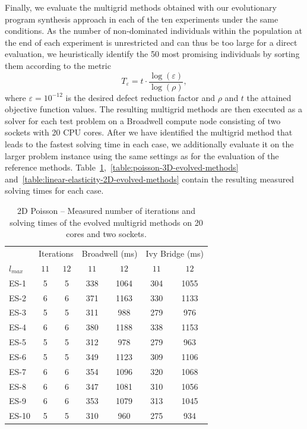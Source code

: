 Finally, we evaluate the multigrid methods obtained with our evolutionary program synthesis approach in each of the ten experiments under the same conditions.
As the number of non-dominated individuals within the population at the end of each experiment is unrestricted and can thus be too large for a direct evaluation, we heuristically identify the 50 most promising individuals by sorting them according to the metric
\begin{equation*}
	T_{\varepsilon} = t \cdot \frac{\log(\varepsilon)}{\log(\rho)},
\end{equation*}
where $\varepsilon = 10^{-12}$ is the desired defect reduction factor and $\rho$ and $t$ the attained objective function values.
The resulting multigrid methods are then executed as a solver for each test problem on a Broadwell compute node consisting of two sockets with 20 CPU cores.%
After we have identified the multigrid method that leads to the fastest solving time in each case, we additionally evaluate it on the larger problem instance using the same settings as for the evaluation of the reference methods.
Table~\ref{table:poisson-2D-evolved-methods},~\ref{table:poisson-3D-evolved-methods} and~\ref{table:linear-elasticity-2D-evolved-methods} contain the resulting measured solving times for each case.
\begin{table}
	\caption{2D Poisson -- Measured number of iterations and solving times of the evolved multigrid methods on 20 cores and two sockets.}
	\label{table:poisson-2D-evolved-methods}
	\centering
	\begin{tabular}{l c c c c c c}
		\toprule
		& \multicolumn{2}{c}{Iterations} & \multicolumn{2}{c}{Broadwell (ms)} & \multicolumn{2}{c}{Ivy Bridge (ms)} \\
		\cmidrule(r){2-3} \cmidrule(r){4-5} \cmidrule(r){6-7}
		$l_{max}$ & $11$& $12$ & $11$ & $12$ & $11$ & $12$\\
		\midrule
		ES-1 & 5 & 5 & 338 & 1064 & 304 & 1055\\
		\midrule
		ES-2 & 6 & 6 & 371 & 1163 & 330 & 1133 \\
		\midrule
		ES-3 & 5 & 5 & 311 & 988 & 279 & 976 \\
		\midrule
		ES-4 & 6 & 6 & 380 & 1188 & 338 & 1153 \\
		\midrule
		ES-5 & 5 & 5 & 312 & 978 & 279 & 963 \\
		\midrule
		ES-6 & 5 & 5 & 349 & 1123 & 309 & 1106 \\
		\midrule
		ES-7 & 6 & 6 & 354 & 1096 & 320 & 1068 \\
		\midrule
		ES-8 & 6 & 6 & 347 & 1081 & 310 & 1056 \\
		\midrule
		ES-9 & 6 & 6 & 353 & 1079 & 313 & 1045 \\
		\midrule
		ES-10 & 5 & 5 & 310 & 960 & 275 & 934 \\
		\bottomrule
	\end{tabular}
\end{table}
